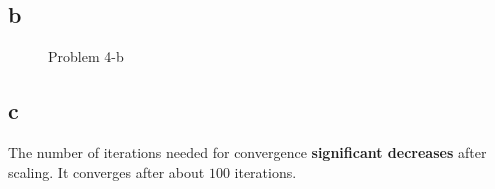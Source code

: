\documentclass[a4paper,11pt]{article}
\theoremstyle{mytheor}
\begin{document}
\subsection*{b}
\begin{figure}[h]
	\caption{Problem 4-b}
\end{figure}

\subsection*{c}
The number of iterations needed for convergence \textbf{significant decreases} after scaling. It converges after about $100$ iterations.
\end{document}
